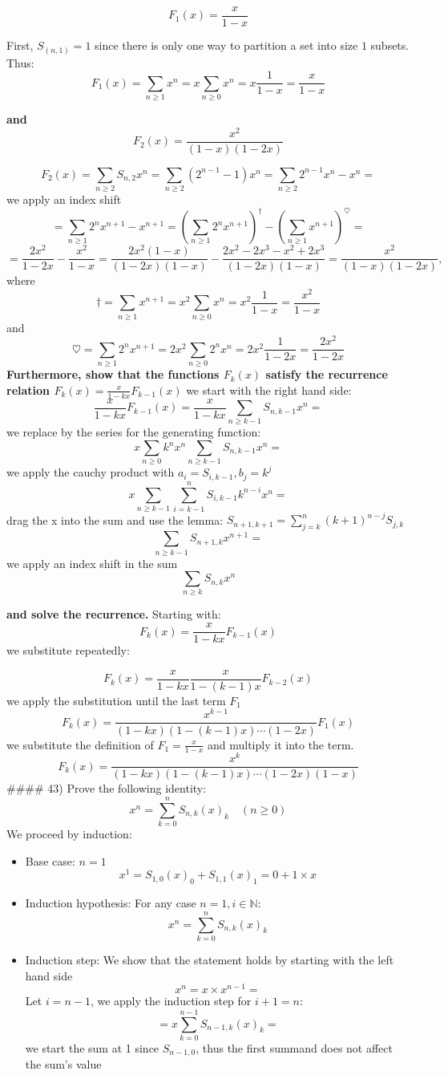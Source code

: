 \documentclass[
]{article}
\begin{document}
\[
F_1(x) = \frac{x}{1-x}
\]

First, \(S_{(n,1)} = 1\) since there is only one way to partition a set
into size \(1\) subsets. Thus: \[
F_1 (x) = \sum_{n \geq 1} x^n = x \sum_{n \geq 0} x^n = x \frac{1}{1-x} = \frac{x}{1-x}
\]

\textbf{and} \[
F_2(x) = \frac{x^2}{(1-x)(1-2x)}
\]

\[
F_2(x) = \sum_{n \geq 2} S_{n,2} x^n = \sum_{n \geq 2} (2^{n-1} - 1) x^n = \sum_{n \geq 2} 2^{n-1} x^n - x^n =
\] we apply an index shift \[
= \sum_{n \geq 1} 2^nx^{n+1} - x^{n+1} = (\sum_{n \geq 1} 2^n x^{n+1})^\dagger - (\sum_{n \geq 1} x^{n+1})^\heartsuit =
\] \[
= \frac{2x^2}{1-2x} - \frac{x^2}{1-x} = \frac{2x^2(1-x)}{(1-2x)(1-x)} - \frac{2x^2-2x^3-x^2+2x^3}{(1-2x)(1-x)} = \frac{x^2}{(1-x)(1-2x)},
\] where \[
\dagger = \sum_{n \geq 1} x^{n+1} = x^2 \sum_{n \geq 0} x^n = x^2 \frac{1}{1-x} = \frac{x^2}{1-x}
\] and \[
\heartsuit =  \sum_{n \geq 1} 2^n x^{n+1} = 2x^2 \sum_{n \geq 0} 2^n x^n = 2x^2 \frac{1}{1-2x} = \frac{2x^2}{1-2x}
\] \textbf{Furthermore, show that the functions \(F_k(x)\) satisfy the
recurrence relation \(F_k(x) = \frac{x}{1-kx}F_{k-1}(x)\)} we start with
the right hand side: \[
\frac{x}{1-kx}F_{k-1}(x) = \frac{x}{1-kx} \sum_{n \geq k-1} S_{n,k-1} x^n =
\] we replace by the series for the generating function: \[
x \sum_{n \geq 0} k^n x^n \sum_{n \geq k-1} S_{n,k-1} x^n =
\] we apply the cauchy product with \(a_i = S_{i,k-1}, b_j = k^j\) \[
x \sum_{n \geq k-1} \sum_{i=k-1}^n S_{i, k-1} k^{n-i} x^n =
\] drag the x into the sum and use the lemma:
\(S_{n+1,k+1} = \sum_{j=k}^n (k+1)^{n-j} S_{j,k}\) \[
\sum_{n\geq k-1} S_{n+1,k} x^{n+1}=
\] we apply an index shift in the sum \[
\sum_{n \geq k} S_{n,k} x^n
\]

\textbf{and solve the recurrence.} Starting with: \[
F_k(x) = \frac{x}{1-kx} F_{k-1}(x)
\] we substitute repeatedly:

\[
F_k(x) = \frac{x}{1-kx} \frac{x}{1-(k-1)x}  F_{k-2}(x)
\] we apply the substitution until the last term \(F_1\) \[
F_k(x) = \frac{x^{k-1}}{(1-kx)(1-(k-1)x) \cdots (1-2x)} F_1(x)
\] we substitute the definition of \(F_1 = \frac{x}{1-x}\) and multiply
it into the term. \[
F_k(x) = \frac{x^{k}}{(1-kx)(1-(k-1)x)\cdots (1-2x) (1-x)} 
\] \#\#\#\# 43) Prove the following identity: \[
x^n = \sum_{k=0}^{n} S_{n,k} (x)_{k} \quad (n \geq 0)
\] We proceed by induction:

\begin{itemize}
\item
  Base case: \(n=1\) \[
  x^1 = S_{1,0} (x)_0 + S_{1,1} (x)_1 = 0 + 1 \times x
  \]
\item
  Induction hypothesis: For any case \(n=1, i \in \mathbb{N}\): \[
  x^n = \sum_{k=0}^n S_{n,k}(x)_k
  \]
\item
  Induction step: We show that the statement holds by starting with the
  left hand side \[
  x^n = x \times x^{n-1} =
  \] Let \(i = n-1\), we apply the induction step for \(i+1=n\): \[
  = x \sum_{k=0}^{n-1} S_{n-1,k} (x)_{k} = 
  \] we start the sum at 1 since \(S_{n-1,0}\), thus the first summand
  does not affect the sum's value
\end{itemize}
\end{document}
